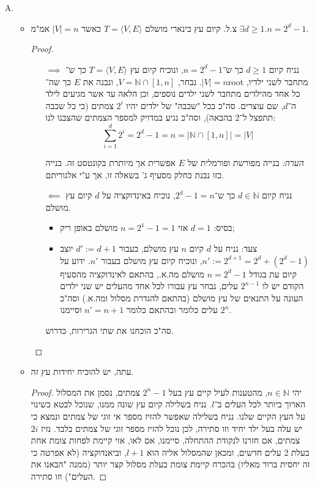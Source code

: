 \documentclass[]{article}
\makeatletter
\newcommand{\skipitems}[1]{
	\addtocounter{\@enumctr}{#1}
}
\newcommand\N     {\mathbb{N}}
\newcommand\ra    {\rangle}
\newcommand\la    {\langle}
\newcommand\sof[1]    {\left | #1 \right |}
\makeatother
\begin{document}
	\section{}
	\begin{enumerate}[A.]
		\skipitems{1}
		\item 
		\begin{itemize}
			\item צ.ל. קיום עץ בינארי מושלם $T = \la V, E \ra$ כאשר $|V| = n$ אמ"מ $\exists d \ge 1. n = 2^d - 1$. 
			\begin{proof} \ 
				\begin{itemize}
					\item[$\implies$]
			נניח קיום $d \ge 1$ כך ש־$n = 2^d - 1$, ונוכיח קיום עץ $T = \la V, E \ra$ כך ש־$|V| = n$. נבחר, $V = \N \cap [1, n]$, ונבנה את $E$ כך שה־root מתחבר לשני ילדיו, כל אחד מהילדים מתחבר לשני ילדים נוספים, וכן הלאה עד אשר מגיעים לילד ה־$d$, שם עוצרים. סה"כ בכל "שכבה" של ילדים יהיו $2^i$ צמתים (כי כל שכבה תתפצל ל־2 בהבאה), וסה"כ נגיע במדויק למספר הצמתים שהצבנו לנו: 
					\[\sum_{i = 1}^{d}2^i = 2^d - 1 = n = \sof{\N \cap [1, n]} = \sof{V}\]
					
					\textit{הערה: }בנייה מפורשת ופורמלית של $E$ אפשרית אך מיותרת בקונטסט זה. בנייה כזו נבנת כחלק מסעיף ג' בשאלה זו, אך ע"י אלגוריתם. 
					\item[$\impliedby$]
					נניח קיום $ d \in \N $ כך ש־$ 2^d - 1 = n $, נוכיח באינדוקציה על $ d $ קיום עץ מושלם.
					\begin{itemize}
						\item בסיס: $ d = 1 $ אזי $ n = 2^1 - 1 = 1 $ מושלם באופן ריק;
						\item צעד: נניח על $ d $ קיום $ n $ עץ מושלם, בעבור $ d' := d + 1 $ יוצב $ n' := 2^{d + 1} = 2^d + (2^d - 1)$, ונוכיח קיום עץ מושלם בעבור $n'$. ידוע על קיום עת בגודל $ n = 2^d - 1 $ מושלם מה.א., בהתאם לאינדוקציה מהסעיף הקודם יש לו $ 2^{n - 1} $ עלים, נבחר עץ עבורו לכל אחד מהעלים יש שני ילדים העונה על התנאים של עץ מושלם (בהתאם להגדרת מסלול ומה.א.) וסה"כ $ 2^n $ עלים כלומר ובהתאם כלומר $ n' = n + 1 $ וסיימנו. 
					\end{itemize}
					סה"כ הוכחנו את שתי הגרירות, כדרוש. 
				\end{itemize}
			\end{proof}
			\item עתה, יש להוכיח יחידות עץ זה. 
			\begin{proof}
				יהי $ n \in \N $, מהטענות לעיל קיים עץ בעל $ 2^n - 1 $ צמתים, נסמן את המסלול הארוך ביותר לכל העלים ב־$ l $. נניח בשלילה קיום עץ שונה ממנו, שנוכל לבטא כשינוי על העץ הקיים שלנו. נניח בשלילה שאפשר להזיז מספר אי זוגי של צמתים ונמצא כי יש עלה בעל ילד יחיד וזו סתירה, לכן נוכל להזיז מספר זוגי של צמתים בלבד. נזיז $ 2i $ צמתים, אם חזרנו לנקודת ההתחלה, סיימנו, אם לאו, אזי קיימת לפחות צומת אחת בעלת 2 עלים חדשים, ומכאן שהמסלול אליה הוא $ l + 1 $, וביאנדוקציה (לא אפרטה כי זה יחסית ברור מאליו) בהכרח קיימת צומת בעלת מסלול קצר יותר (ממנה "הבאנו את העלים") וזו סתירה. 
			\end{proof}
		\end{itemize}
		

\end{enumerate}
\end{document}
